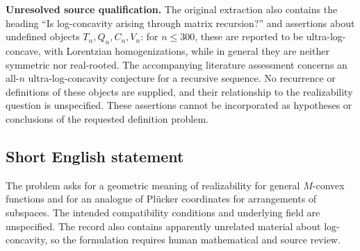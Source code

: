 \documentclass[11pt]{article}
\begin{document}
\textbf{Unresolved source qualification.} The original extraction also contains the heading ``Is log-concavity arising through matrix recursion?'' and assertions about undefined objects \(T_n,Q_n,C_n,V_n\): for \(n\leq300\), these are reported to be ultra-log-concave, with Lorentzian homogenizations, while in general they are neither symmetric nor real-rooted. The accompanying literature assessment concerns an all-\(n\) ultra-log-concavity conjecture for a recursive sequence. No recurrence or definitions of these objects are supplied, and their relationship to the realizability question is unspecified. These assertions cannot be incorporated as hypotheses or conclusions of the requested definition problem.
\subsection{Short English statement}
The problem asks for a geometric meaning of realizability for general \(M\)-convex functions and for an analogue of Pl\"ucker coordinates for arrangements of subspaces. The intended compatibility conditions and underlying field are unspecified. The record also contains apparently unrelated material about log-concavity, so the formulation requires human mathematical and source review.
\end{document}
